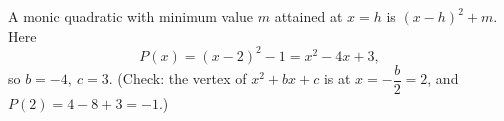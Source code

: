 A monic quadratic with minimum value $m$ attained at $x=h$ is $(x-h)^2+m$. Here
\[
P(x)=(x-2)^2-1=x^2-4x+3 ,
\]
so $\boxed{b=-4,\ c=3}$. (Check: the vertex of $x^2+bx+c$ is at $x=-\dfrac {b}{2}=2$, and $P(2)=4-8+3=-1$.)
